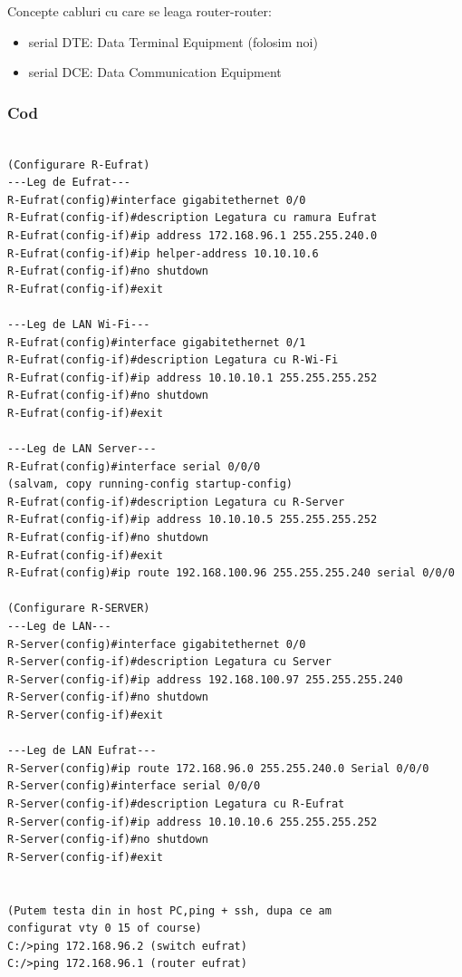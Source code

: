 \documentclass{article}
\begin{document}
Concepte cabluri cu care se leaga router-router:
\begin{itemize}
    \item serial DTE: Data Terminal Equipment (folosim noi)
    \item serial DCE: Data Communication Equipment
\end{itemize}

\subsubsection{Cod}

\begin{verbatim}

(Configurare R-Eufrat)
---Leg de Eufrat---
R-Eufrat(config)#interface gigabitethernet 0/0
R-Eufrat(config-if)#description Legatura cu ramura Eufrat
R-Eufrat(config-if)#ip address 172.168.96.1 255.255.240.0
R-Eufrat(config-if)#ip helper-address 10.10.10.6
R-Eufrat(config-if)#no shutdown
R-Eufrat(config-if)#exit

---Leg de LAN Wi-Fi---
R-Eufrat(config)#interface gigabitethernet 0/1
R-Eufrat(config-if)#description Legatura cu R-Wi-Fi
R-Eufrat(config-if)#ip address 10.10.10.1 255.255.255.252
R-Eufrat(config-if)#no shutdown
R-Eufrat(config-if)#exit

---Leg de LAN Server---
R-Eufrat(config)#interface serial 0/0/0
(salvam, copy running-config startup-config)
R-Eufrat(config-if)#description Legatura cu R-Server
R-Eufrat(config-if)#ip address 10.10.10.5 255.255.255.252
R-Eufrat(config-if)#no shutdown 
R-Eufrat(config-if)#exit
R-Eufrat(config)#ip route 192.168.100.96 255.255.255.240 serial 0/0/0

(Configurare R-SERVER)
---Leg de LAN---
R-Server(config)#interface gigabitethernet 0/0
R-Server(config-if)#description Legatura cu Server
R-Server(config-if)#ip address 192.168.100.97 255.255.255.240
R-Server(config-if)#no shutdown
R-Server(config-if)#exit

---Leg de LAN Eufrat---
R-Server(config)#ip route 172.168.96.0 255.255.240.0 Serial 0/0/0
R-Server(config)#interface serial 0/0/0
R-Server(config-if)#description Legatura cu R-Eufrat
R-Server(config-if)#ip address 10.10.10.6 255.255.255.252
R-Server(config-if)#no shutdown
R-Server(config-if)#exit


(Putem testa din in host PC,ping + ssh, dupa ce am 
configurat vty 0 15 of course)
C:/>ping 172.168.96.2 (switch eufrat)
C:/>ping 172.168.96.1 (router eufrat)

\end{verbatim}
\end{document}
